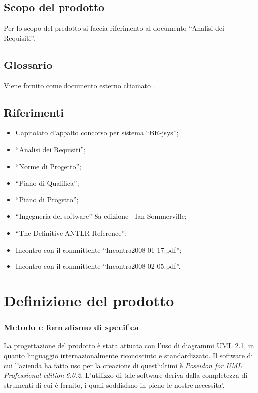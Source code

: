 \documentclass[11pt,titlepage,a4paper]{report}
\begin{document}
\section{Scopo del prodotto}
Per lo scopo del prodotto si faccia riferimento al documento ``Analisi dei Requisiti''.
\section{Glossario}
Viene fornito come documento esterno chiamato \Glossario .
\section{Riferimenti}
\begin{itemize}
\item Capitolato d'appalto concorso per sistema ``BR-jsys'';
\item ``Analisi dei Requisiti'';
\item ``Norme di Progetto'';
\item ``Piano di Qualifica'';
\item ``Piano di Progetto'';
\item ``Ingegneria del software'' 8a edizione - Ian Sommerville;
\item ``The Definitive ANTLR Reference'';
\item Incontro con il committente ``Incontro2008-01-17.pdf'';
\item Incontro con il committente ``Incontro2008-02-05.pdf''.
\end{itemize}

\chapter{Definizione del prodotto}
\subsection{Metodo e formalismo di specifica}
La progettazione del prodotto \`e stata attuata con l'uso di diagrammi UML 2.1, in quanto linguaggio internazionalmente riconosciuto e standardizzato.
Il software di cui l’azienda ha fatto uso per la creazione di quest'ultimi \`e \textit{Poseidon for UML Professional edition 6.0.2}. L'utilizzo di tale software deriva dalla completezza
di strumenti di cui \`e fornito, i quali soddisfano in pieno le nostre necessita'.
\end{document}
